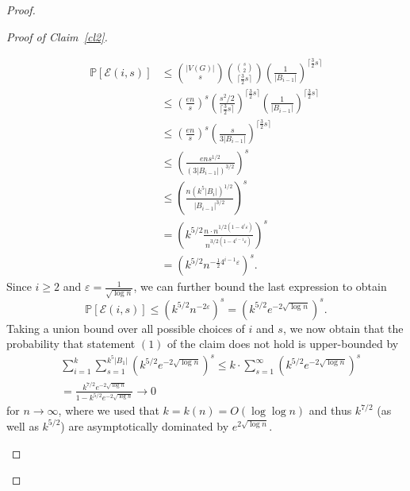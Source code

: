 \documentclass[a4paper,10pt]{amsart}
\begin{document}
\begin{proof}
\begin{proof}[Proof of Claim~\ref{cl2}]
\begin{enumerate}
    \begin{align*}
        \mathbb{P}[\mathcal{E}(i,s)]&\le \binom{|V(G)|}{s}\binom{\binom{s}{2}}{\lceil\frac{3}{2}s\rceil}\left(\frac{1}{|B_{i-1}|}\right)^{\lceil\frac{3}{2}s\rceil}\\
        &\le \left(\frac{en}{s}\right)^s \left(\frac{s^2/2}{\lceil\frac{3}{2}s\rceil}\right)^{\lceil\frac{3}{2}s\rceil}\left(\frac{1}{|B_{i-1}|}\right)^{\lceil\frac{3}{2}s\rceil} \\
        &\le \left(\frac{en}{s}\right)^s \left(\frac{s}{3|B_{i-1}|}\right)^{\lceil\frac{3}{2}s\rceil}\\
        &\le \left(\frac{ens^{1/2}}{(3|B_{i-1}|)^{3/2}}\right)^s\\
        &\le \left(\frac{n(k^5|B_i|)^{1/2}}{|B_{i-1}|^{3/2}}\right)^s\\
        &= \left(k^{5/2}\frac{n\cdot n^{1/2(1-4^i\varepsilon)}}{n^{3/2(1-4^{i-1}\varepsilon)}}\right)^s\\
        &=\left(k^{5/2}n^{-\frac{1}{2}4^{i-1}\varepsilon}\right)^s.
    \end{align*}  
    Since $i\ge 2$ and $\varepsilon=\frac{1}{\sqrt{\log n}}$, we can further bound the last expression to obtain $$\mathbb{P}[\mathcal{E}(i,s)]\le (k^{5/2}n^{-2\varepsilon})^s=(k^{5/2}e^{-2\sqrt{\log n}})^s.$$ Taking a union bound over all possible choices of $i$ and $s$, we now obtain that the probability that statement $(1)$ of the claim does not hold is upper-bounded by 
    \begin{align*}&\sum_{i=1}^{k}\sum_{s=1}^{k^5|B_1|} (k^{5/2}e^{-2\sqrt{\log n}})^s\le k\cdot \sum_{s=1}^{\infty}(k^{5/2}e^{-2\sqrt{\log n}})^s \\
    &=\frac{k^{7/2}e^{-2\sqrt{\log n}}}{1-k^{5/2}e^{-2\sqrt{\log n}}} \rightarrow 0\end{align*} for $n\rightarrow \infty$, where we used that $k=k(n)=O(\log \log n)$ and thus  $k^{7/2}$ (as well as $k^{5/2}$) are asymptotically dominated by 
 $e^{2\sqrt{\log n}}$.
    

\end{enumerate}
\end{proof}
\end{proof}
\end{document}
